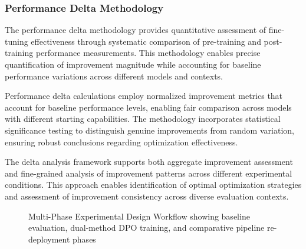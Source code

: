 \subsubsection{Performance Delta Methodology}

The performance delta methodology provides quantitative assessment of fine-tuning effectiveness through systematic comparison of pre-training and post-training performance measurements. This methodology enables precise quantification of improvement magnitude while accounting for baseline performance variations across different models and contexts.

Performance delta calculations employ normalized improvement metrics that account for baseline performance levels, enabling fair comparison across models with different starting capabilities. The methodology incorporates statistical significance testing to distinguish genuine improvements from random variation, ensuring robust conclusions regarding optimization effectiveness.

The delta analysis framework supports both aggregate improvement assessment and fine-grained analysis of improvement patterns across different experimental conditions. This approach enables identification of optimal optimization strategies and assessment of improvement consistency across diverse evaluation contexts.

\begin{figure}[htbp]
    \centering
    \caption{Multi-Phase Experimental Design Workflow showing baseline evaluation, dual-method DPO training, and comparative pipeline re-deployment phases}
    \label{fig:multi-phase-design}
\end{figure}

